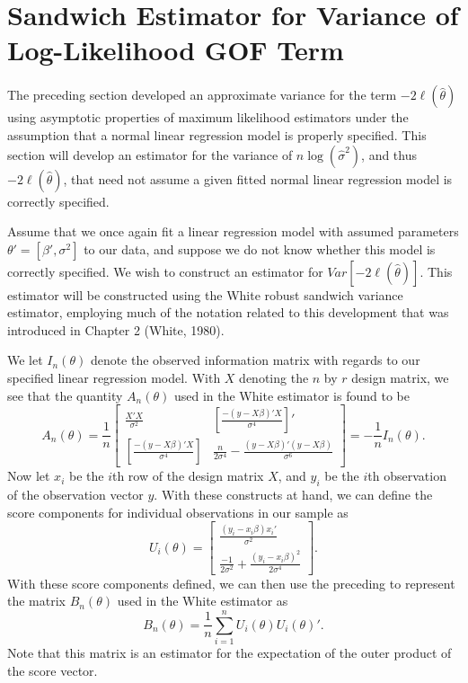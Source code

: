 		\section{Sandwich Estimator for Variance of Log-Likelihood GOF Term} \label{sec:sand_var}

		The preceding section developed an approximate variance for the term $-2 \ell (\hat{\theta})$ using asymptotic properties of maximum likelihood estimators under the assumption
		that a normal linear regression model is properly specified. This section will develop an estimator for the variance of $n\log(\hat{\sigma}^2)$, and thus $-2 \ell (\hat{\theta})$,
		that need not assume a given fitted normal linear regression model is correctly specified.

		Assume that we once again fit a linear regression model with assumed parameters $\theta' = [\beta', \sigma^2]$ to our data, and suppose we do not know whether this model is correctly specified.
		We wish to construct an estimator for $Var \left[ -2 \ell (\hat{\theta}  ) \right]$. This estimator will be constructed using the White robust sandwich variance estimator, employing
		much of the notation related to this development that was introduced in Chapter 2 (White, 1980).

		We let $I_{n} (\theta)$ denote the observed information matrix with regards to our specified linear regression model. With $X$ denoting the $n$ by $r$ design matrix, we see that
		the quantity $A_n (\theta)$ used in the White estimator is found to be 
		\begin{equation*}
			A_n(\theta) = \frac{1}{n}
			\begin{bmatrix}
				\frac{X'X}{\sigma^2} & \left[ \frac{-(y-X\beta)'X}{\sigma^4} \right]' \\
				\left[ \frac{-(y-X\beta)'X}{\sigma^4} \right] &  \frac{n}{2 \sigma^4} - \frac{(y-X\beta)'(y-X\beta)}{\sigma^6}
				\end{bmatrix}
				= -\frac{1}{n} I_n(\theta) .
		\end{equation*}
		Now let $x_i$ be the $i$th row of the design matrix $X$, and $y_i$ be the $i$th observation of the observation vector $y$. With these constructs at hand, we can define the score components
		for individual observations in our sample as
		\begin{equation*}
			U_i(\theta) = 
			\begin{bmatrix}
				\frac{(y_i-x_i \beta)x_i'}{\sigma^2} \\
				\frac{-1}{2 \sigma^2} + \frac{(y_i - x_i \beta)^2}{2 \sigma^4}
			\end{bmatrix}
			.
		\end{equation*}
		With these score components defined, we can then use the preceding to represent the matrix $B_n (\theta)$ used in the White estimator as
		\begin{equation*}
			B_n(\theta) = \frac{1}{n} \sum_{i=1}^{n} U_i(\theta) U_i(\theta)' .
		\end{equation*}
		Note that this matrix is an estimator for the expectation of the outer product of the score vector.


